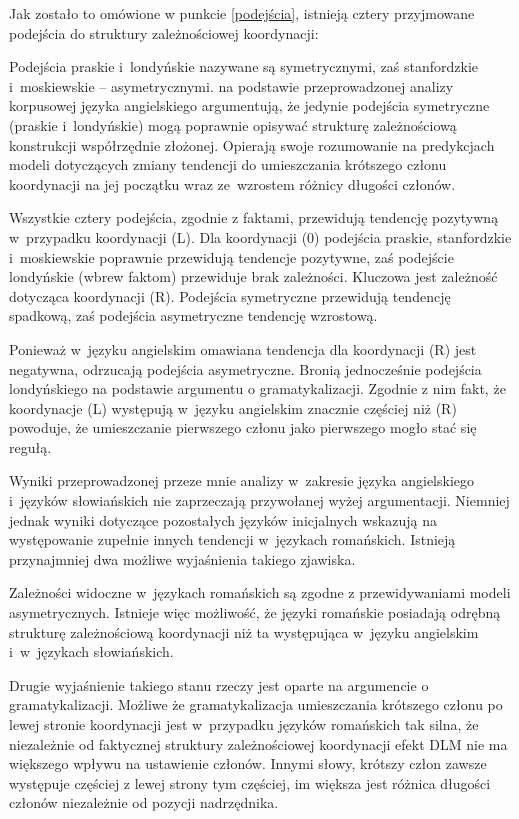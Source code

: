 Jak zostało to omówione w punkcie \ref{podejścia}, istnieją cztery przyjmowane podejścia do struktury zależnościowej koordynacji:



Podejścia praskie i~londyńskie nazywane są symetrycznymi, zaś stanfordzkie i~moskiewskie -- asymetrycznymi. \cite{przepiorkowski2023conjunct} na podstawie przeprowadzonej analizy korpusowej języka angielskiego argumentują, że jedynie podejścia symetryczne (praskie i~londyńskie) mogą poprawnie opisywać strukturę zależnościową konstrukcji współrzędnie złożonej. Opierają swoje rozumowanie na predykcjach modeli dotyczących zmiany tendencji do umieszczania krótszego członu koordynacji na jej początku wraz ze~wzrostem różnicy długości członów.

Wszystkie cztery podejścia, zgodnie z faktami, przewidują tendencję pozytywną w~przypadku koordynacji (L). Dla koordynacji (0) podejścia praskie, stanfordzkie i~moskiewskie poprawnie przewidują tendencje pozytywne, zaś podejście londyńskie (wbrew faktom) przewiduje brak zależności. Kluczowa jest zależność dotycząca koordynacji (R). Podejścia symetryczne przewidują tendencję spadkową, zaś podejścia asymetryczne tendencję wzrostową.

Ponieważ w~języku angielskim omawiana tendencja dla koordynacji (R) jest negatywna, \cite{przepiorkowski2023conjunct} odrzucają podejścia asymetryczne. Bronią jednocześnie podejścia londyńskiego na podstawie argumentu o gramatykalizacji. Zgodnie z nim fakt, że koordynacje (L) występują w~języku angielskim znacznie częściej niż (R) powoduje, że umieszczanie pierwszego członu jako pierwszego mogło stać się regułą.

Wyniki przeprowadzonej przeze mnie analizy w~zakresie języka angielskiego i~języków słowiańskich nie zaprzeczają przywołanej wyżej argumentacji. Niemniej jednak wyniki dotyczące pozostałych języków inicjalnych wskazują na występowanie zupełnie innych tendencji w~językach romańskich. Istnieją przynajmniej dwa możliwe wyjaśnienia takiego zjawiska.

Zależności widoczne w~językach romańskich są zgodne z przewidywaniami modeli asymetrycznych. Istnieje więc możliwość, że języki romańskie posiadają odrębną strukturę zależnościową koordynacji niż ta występująca w~języku angielskim i~w~językach słowiańskich.

Drugie wyjaśnienie takiego stanu rzeczy jest oparte na argumencie o gramatykalizacji. Możliwe że gramatykalizacja umieszczania krótszego członu po lewej stronie koordynacji jest w~przypadku języków romańskich tak silna, że niezależnie od faktycznej struktury zależnościowej koordynacji efekt DLM nie ma większego wpływu na ustawienie członów. Innymi słowy, krótszy człon zawsze występuje częściej z lewej strony tym częściej, im większa jest różnica długości członów niezależnie od pozycji nadrzędnika.

